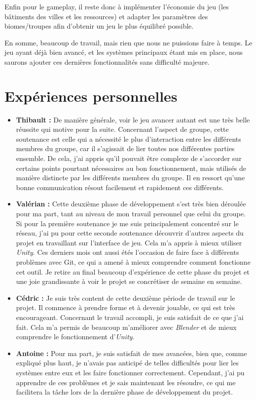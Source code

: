 \documentclass[12pt]{report}
\begin{document}
Enfin pour le gameplay, il reste donc à implémenter l’économie du jeu (les
bâtiments des villes et les ressources) et adapter les paramètres des
biomes/troupes afin d’obtenir un jeu le plus équilibré possible.

En somme, beaucoup de travail, mais rien que nous ne puissions faire à temps. Le
jeu ayant déjà bien avancé, et les systèmes principaux étant mis en place, nous
saurons ajouter ces dernières fonctionnalités sans difficulté majeure.

\chapter{Expériences personnelles}

\begin{itemize}
    \item \textbf{Thibault :} De manière générale, voir le jeu avancer autant
    est une très belle réussite qui motive pour la suite. Concernant l’aspect de
    groupe, cette soutenance est celle qui a nécessité le plus d’interaction
    entre les différents membres du groupe, car il s’agissait de lier toutes nos
    différentes parties ensemble. De cela, j’ai appris qu’il pouvait être
    complexe de s’accorder sur certains points pourtant nécessaires au bon
    fonctionnement, mais utilisés de manière distincte par les différents
    membres du groupe. Il en ressort qu’une bonne communication résout
    facilement et rapidement ces différents.
    \item \textbf{Valérian :} Cette deuxième phase de développement s’est très
    bien déroulée pour ma part, tant au niveau de mon travail personnel que
    celui du groupe. Si pour la première soutenance je me suis principalement
    concentré sur le réseau, j’ai pu pour cette seconde soutenance découvrir
    d’autres aspects du projet en travaillant sur l’interface de jeu. Cela m’a
    appris à mieux utiliser \textit{Unity}. Ces derniers mois ont aussi étés
    l’occasion de faire face à différents problèmes avec Git, ce qui a amené à
    mieux comprendre comment fonctionne cet outil.
    Je retire au final beaucoup d’expérience de cette phase du projet et une
    joie grandissante à voir le projet se concrétiser de semaine en semaine.
    \newpage
    \item \textbf{Cédric :} Je suis très content de cette deuxième période de
    travail sur le projet. Il commence à prendre forme et à devenir jouable, ce
    qui est très encourageant. Concernant le travail accompli, je suis
    satisfait de ce que j’ai fait. Cela m’a permis de beaucoup m’améliorer avec
    \textit{Blender} et de mieux comprendre le fonctionnement d’\textit{Unity}.
    \item \textbf{Antoine :} Pour ma part, je suis satisfait de mes avancées,
    bien que, comme expliqué plus haut, je n'avais pas anticipé de telles
    difficultés pour lier les systèmes entre eux et les faire fonctionner
    correctement. Cependant, j'ai pu apprendre de ces problèmes et je sais
    maintenant les résoudre, ce qui me facilitera la tâche lors de la dernière
    phase de développement du projet.
\end{itemize}
\end{document}
